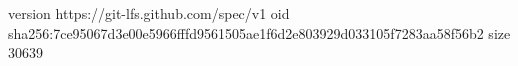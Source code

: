 version https://git-lfs.github.com/spec/v1
oid sha256:7ce95067d3e00e5966fffd9561505ae1f6d2e803929d033105f7283aa58f56b2
size 30639
